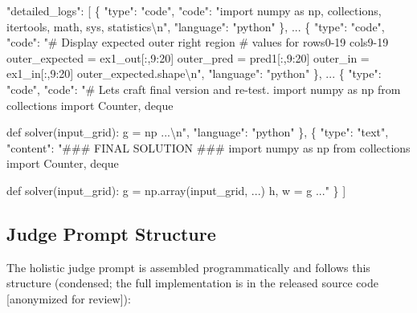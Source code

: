 \documentclass[10pt]{article}
\newenvironment{Shaded}{}{}
\newcommand{\NormalTok}[1]{#1}
\begin{document}
\begin{Shaded}
\begin{Highlighting}[]
\NormalTok{"detailed\_logs": [}
\NormalTok{  \{}
\NormalTok{    "type": "code",}
\NormalTok{    "code": "import numpy as np, collections,}
\NormalTok{             itertools, math, sys, statistics\textbackslash{}n",}
\NormalTok{    "language": "python"}
\NormalTok{  \},}
\NormalTok{  ...}
\NormalTok{  \{}
\NormalTok{    "type": "code",}
\NormalTok{    "code": "\# Display expected outer right region}
\NormalTok{             \# values for rows0{-}19 cols9{-}19}
\NormalTok{             outer\_expected = ex1\_out[:,9:20]}
\NormalTok{             outer\_pred = pred1[:,9:20]}
\NormalTok{             outer\_in = ex1\_in[:,9:20]}
\NormalTok{             outer\_expected.shape\textbackslash{}n",}
\NormalTok{    "language": "python"}
\NormalTok{  \},}
\NormalTok{  ...}
\NormalTok{  \{}
\NormalTok{    "type": "code",}
\NormalTok{    "code": "\# Let\textquotesingle{}s craft final version and re{-}test.}
\NormalTok{             import numpy as np}
\NormalTok{             from collections import Counter, deque}

\NormalTok{             def solver(input\_grid):}
\NormalTok{                 g = np ...\textbackslash{}n",}
\NormalTok{    "language": "python"}
\NormalTok{  \},}
\NormalTok{  \{}
\NormalTok{    "type": "text",}
\NormalTok{    "content": "\#\#\# FINAL SOLUTION \#\#\#}
\NormalTok{               import numpy as np}
\NormalTok{               from collections import Counter, deque}

\NormalTok{               def solver(input\_grid):}
\NormalTok{                   g = np.array(input\_grid, ...)}
\NormalTok{                   h, w = g ..."}
\NormalTok{  \}}
\NormalTok{]}
\end{Highlighting}
\end{Shaded}

\hypertarget{judge-prompt-structure}{%
\subsection{Judge Prompt Structure}\label{judge-prompt-structure}}

The holistic judge prompt is assembled programmatically and follows this
structure (condensed; the full implementation is in the released source
code {[}anonymized for review{]}):
\end{document}

